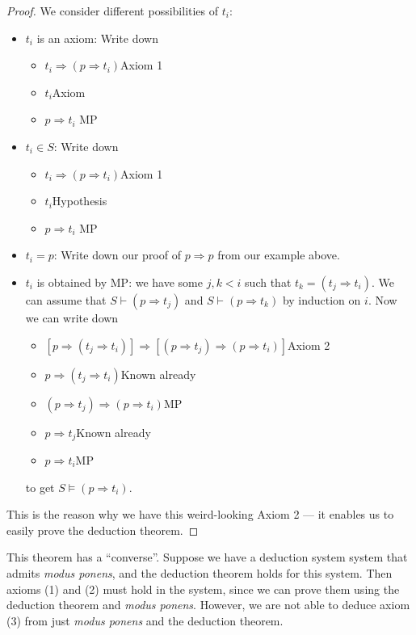 \documentclass[a4paper]{article}
\begin{document}
\begin{proof}
  We consider different possibilities of $t_i$:
  \begin{itemize}
    \item $t_i$ is an axiom: Write down
      \begin{itemize}
        \item $t_i\Rightarrow (p\Rightarrow t_i)$\hfill Axiom 1
        \item $t_i$\hfill Axiom
        \item $p\Rightarrow t_i$ \hfill MP
      \end{itemize}
    \item $t_i\in S$: Write down
      \begin{itemize}
        \item $t_i\Rightarrow (p\Rightarrow t_i)$\hfill Axiom 1
        \item $t_i$\hfill Hypothesis
        \item $p\Rightarrow t_i$ \hfill MP
      \end{itemize}
    \item $t_i = p$: Write down our proof of $p\Rightarrow p$ from our example above.
    \item $t_i$ is obtained by MP: we have some $j, k< i$ such that $t_k = (t_j\Rightarrow t_i)$. We can assume that $S\vdash (p\Rightarrow t_j)$ and $S\vdash (p\Rightarrow t_k)$ by induction on $i$. Now we can write down
      \begin{itemize}
        \item $[p\Rightarrow (t_j\Rightarrow t_i)]\Rightarrow [(p\Rightarrow t_j)\Rightarrow (p\Rightarrow t_i)]$\hfill Axiom 2
        \item $p\Rightarrow (t_j\Rightarrow t_i)$\hfill Known already
        \item $(p\Rightarrow t_j)\Rightarrow (p\Rightarrow t_i)$\hfill MP
        \item $p\Rightarrow t_j$\hfill Known already
        \item $p\Rightarrow t_i$\hfill MP
      \end{itemize}
      to get $S\models (p\Rightarrow t_i)$.
  \end{itemize}
  This is the reason why we have this weird-looking Axiom 2 --- it enables us to easily prove the deduction theorem.
\end{proof}

This theorem has a ``converse''. Suppose we have a deduction system system that admits \emph{modus ponens}, and the deduction theorem holds for this system. Then axioms (1) and (2) must hold in the system, since we can prove them using the deduction theorem and \emph{modus ponens}. However, we are not able to deduce axiom (3) from just \emph{modus ponens} and the deduction theorem.
\end{document}
